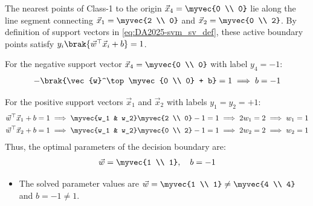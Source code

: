\begin{enumerate}[label=\thesubsection.\arabic*, ref=\thesubsection.\theenumi]
The nearest points of Class-1 to the origin $\vec{x}_4 = \myvec{0 \\ 0}$ lie along the line segment connecting $\vec{x}_1 = \myvec{2 \\ 0}$ and $\vec{x}_2 = \myvec{0 \\ 2}$. By definition of support vectors in \eqref{eq:DA2025-svm_sv_def}, these active boundary points satisfy $y_i\brak{\vec{w}^\top \vec{x}_i + b} = 1$.

For the negative support vector $\vec{x}_4 = \myvec{0 \\ 0}$ with label $y_4 = -1$:
\begin{align}
	-\brak{\vec{w}^\top \myvec{0 \\ 0} + b} = 1 \implies b = -1
\end{align}

For the positive support vectors $\vec{x}_1$ and $\vec{x}_2$ with labels $y_1 = y_2 = +1$:
\begin{align}
	\vec{w}^\top \vec{x}_1 + b = 1 &\implies \myvec{w_1 & w_2}\myvec{2 \\ 0} - 1 = 1 \implies 2w_1 = 2 \implies w_1 = 1
	\\
	\vec{w}^\top \vec{x}_2 + b = 1 &\implies \myvec{w_1 & w_2}\myvec{0 \\ 2} - 1 = 1 \implies 2w_2 = 2 \implies w_2 = 1
\end{align}
Thus, the optimal parameters of the decision boundary are:
\begin{align}
	\vec{w} = \myvec{1 \\ 1}, \quad b = -1
\end{align}

\begin{itemize}
	\item The solved parameter values are $\vec{w} = \myvec{1 \\ 1} \neq \myvec{4 \\ 4}$ and $b = -1 \neq 1$. 
	

\end{itemize}
\end{enumerate}
